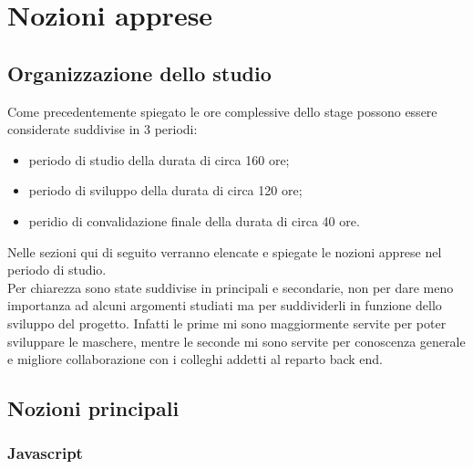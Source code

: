 
\chapter{Nozioni apprese}
\label{cap:nozioni-apprese}


\section{Organizzazione dello studio}

Come precedentemente spiegato le ore complessive dello stage possono essere considerate suddivise in 3 periodi:
\begin{itemize}
	\item periodo di studio della durata di circa 160 ore;
	\item periodo di sviluppo della durata di circa 120 ore;
	\item peridio di convalidazione finale della durata di circa 40 ore.
\end{itemize}
Nelle sezioni qui di seguito verranno elencate e spiegate le nozioni apprese nel periodo di studio.\\
Per chiarezza sono state suddivise in principali e secondarie, non per dare meno importanza ad alcuni argomenti studiati ma per suddividerli in funzione dello sviluppo del progetto. Infatti le prime mi sono maggiormente servite per poter sviluppare le maschere, mentre le seconde mi sono servite per conoscenza generale e migliore collaborazione con i colleghi addetti al reparto back end.

\section{Nozioni principali}

\subsection{Javascript}

